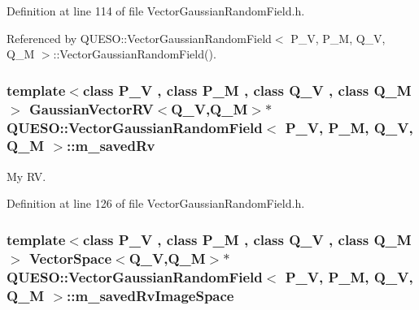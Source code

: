 Definition at line 114 of file Vector\-Gaussian\-Random\-Field.\-h.



Referenced by Q\-U\-E\-S\-O\-::\-Vector\-Gaussian\-Random\-Field$<$ P\-\_\-\-V, P\-\_\-\-M, Q\-\_\-\-V, Q\-\_\-\-M $>$\-::\-Vector\-Gaussian\-Random\-Field().

\hypertarget{class_q_u_e_s_o_1_1_vector_gaussian_random_field_a7e2ed5d146f65c8c4ddbd1d4e496647d}{
\subsubsection[{m\-\_\-saved\-Rv}]{\setlength{\rightskip}{0pt plus 5cm}template$<$class P\-\_\-\-V , class P\-\_\-\-M , class Q\-\_\-\-V , class Q\-\_\-\-M $>$ {\bf Gaussian\-Vector\-R\-V}$<$Q\-\_\-\-V,Q\-\_\-\-M$>$$\ast$ {\bf Q\-U\-E\-S\-O\-::\-Vector\-Gaussian\-Random\-Field}$<$ P\-\_\-\-V, P\-\_\-\-M, Q\-\_\-\-V, Q\-\_\-\-M $>$\-::m\-\_\-saved\-Rv\hspace{0.3cm}{\ttfamily [protected]}}}\label{class_q_u_e_s_o_1_1_vector_gaussian_random_field_a7e2ed5d146f65c8c4ddbd1d4e496647d}


My R\-V. 



Definition at line 126 of file Vector\-Gaussian\-Random\-Field.\-h.

\hypertarget{class_q_u_e_s_o_1_1_vector_gaussian_random_field_a8fba910fff533442361ad7bd93e5706b}{
\subsubsection[{m\-\_\-saved\-Rv\-Image\-Space}]{\setlength{\rightskip}{0pt plus 5cm}template$<$class P\-\_\-\-V , class P\-\_\-\-M , class Q\-\_\-\-V , class Q\-\_\-\-M $>$ {\bf Vector\-Space}$<$Q\-\_\-\-V,Q\-\_\-\-M$>$$\ast$ {\bf Q\-U\-E\-S\-O\-::\-Vector\-Gaussian\-Random\-Field}$<$ P\-\_\-\-V, P\-\_\-\-M, Q\-\_\-\-V, Q\-\_\-\-M $>$\-::m\-\_\-saved\-Rv\-Image\-Space\hspace{0.3cm}{\ttfamily [protected]}}}\label{class_q_u_e_s_o_1_1_vector_gaussian_random_field_a8fba910fff533442361ad7bd93e5706b}


